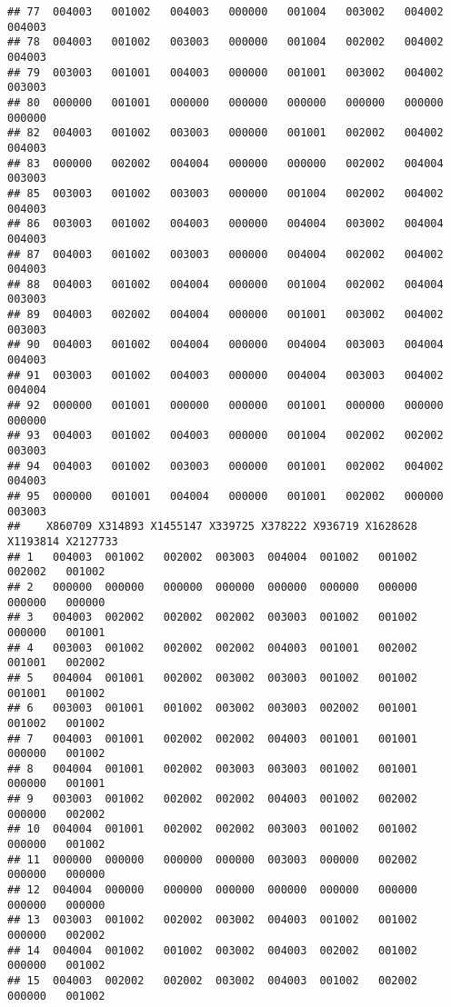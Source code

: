 \documentclass[
]{article}
\begin{document}
\begin{verbatim}
## 77  004003   001002   004003   000000   001004   003002   004002   004003
## 78  004003   001002   003003   000000   001004   002002   004002   004003
## 79  003003   001001   004003   000000   001001   003002   004002   003003
## 80  000000   001001   000000   000000   000000   000000   000000   000000
## 82  004003   001002   003003   000000   001001   002002   004002   004003
## 83  000000   002002   004004   000000   000000   002002   004004   003003
## 85  003003   001002   003003   000000   001004   002002   004002   004003
## 86  003003   001002   004003   000000   004004   003002   004004   004003
## 87  004003   001002   003003   000000   004004   002002   004002   004003
## 88  004003   001002   004004   000000   001004   002002   004004   003003
## 89  004003   002002   004004   000000   001001   003002   004002   003003
## 90  004003   001002   004004   000000   004004   003003   004004   004003
## 91  003003   001002   004003   000000   004004   003003   004002   004004
## 92  000000   001001   000000   000000   001001   000000   000000   000000
## 93  004003   001002   004003   000000   001004   002002   002002   003003
## 94  004003   001002   003003   000000   001001   002002   004002   004003
## 95  000000   001001   004004   000000   001001   002002   000000   003003
##    X860709 X314893 X1455147 X339725 X378222 X936719 X1628628 X1193814 X2127733
## 1   004003  001002   002002  003003  004004  001002   001002   002002   001002
## 2   000000  000000   000000  000000  000000  000000   000000   000000   000000
## 3   004003  002002   002002  002002  003003  001002   001002   000000   001001
## 4   003003  001002   002002  002002  004003  001001   002002   001001   002002
## 5   004004  001001   002002  003002  003003  001002   001002   001001   001002
## 6   003003  001001   001002  003002  003003  002002   001001   001002   001002
## 7   004003  001001   002002  002002  004003  001001   001001   000000   001002
## 8   004004  001001   002002  003003  003003  001002   001001   000000   001001
## 9   003003  001002   002002  002002  004003  001002   002002   000000   002002
## 10  004004  001001   002002  002002  003003  001002   001002   000000   001002
## 11  000000  000000   000000  000000  003003  000000   002002   000000   000000
## 12  004004  000000   000000  000000  000000  000000   000000   000000   000000
## 13  003003  001002   002002  003002  004003  001002   001002   000000   002002
## 14  004004  001002   001002  003002  004003  002002   001002   000000   001002
## 15  004003  002002   002002  003002  004003  001002   002002   000000   001002

\end{verbatim}
\end{document}

